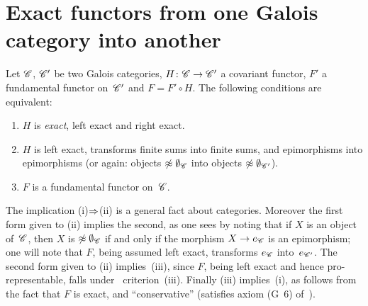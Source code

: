 \section{Exact functors from one Galois category into another}
\label{V.6}

\begin{proposition}
\label{V.6.1}
Let $\cal{C}$, $\cal{C'}$ be two Galois categories,
$H\colon \cal{C}\to \cal{C'}$ a covariant functor, $F'$ a fundamental
functor on~$\cal{C'}$ and $F=F' \circ H$. The following conditions are
equivalent:
\begin{enumerate}
\item[(i)] $H$ is \emph{exact}, \ie left exact and right
exact.
\item[(ii)] $H$ is left exact, transforms finite sums into
finite sums, and epimorphisms into epimorphisms (or again:
objects $\not\approx \emptyset_{\cal{C}}$ into objects $\not\approx
\emptyset_{\cal{C'}}$).
\item[(iii)] $F$ is a fundamental functor on~$\cal{C}$.
\end{enumerate}
\end{proposition}

The implication (i)$\To$(ii) is a general fact about
categories. Moreover the first form given to (ii)
implies the second, as one sees by noting that if $X$ is an object
of~$\cal{C}$, then $X$ is $\not\approx \emptyset_{\cal{C}}$ if and only if the
morphism $X\to e_{\cal{C}}$ is an epimorphism; one will note that
$F$, being assumed left exact, transforms $e_{\cal{C}}$
into~$e_{\cal{C'}}$. The second form given to (ii)
implies~(iii), since $F$, being left exact and hence
pro-representable, falls under~
criterion~(iii). Finally (iii) implies~(i), as follows from the
fact that $F$ is exact, and ``conservative'' (\ie satisfies axiom
(G~6) of~\no {}).

